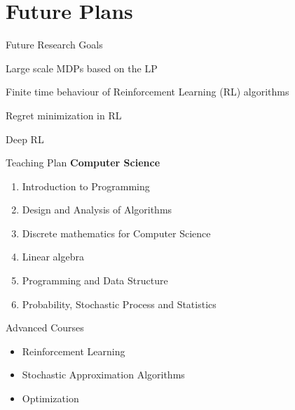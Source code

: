 \documentclass[10pt]{beamer}
\begin{document}
\section{Future Plans}
\begin{frame}[fragile]{Future Research Goals}
\begin{block}{\Large Large scale MDPs based on the LP}
\end{block}
\vspace{10pt}
\begin{block}{\Large Finite time behaviour of Reinforcement Learning (RL) algorithms}
\end{block}
\vspace{10pt}
\begin{block}{\Large Regret minimization in RL}
\end{block}
\vspace{10pt}
\begin{block}{\Large Deep RL}
\end{block}

\end{frame}
\begin{frame}[fragile]{Teaching Plan}
\textbf{Computer Science}
\begin{enumerate}
\item Introduction to Programming
\item Design and Analysis of Algorithms
\item Discrete mathematics for Computer Science
\item Linear algebra
\item Programming and Data Structure
\item Probability, Stochastic Process and Statistics
\end{enumerate}

\end{frame}
\begin{frame}[fragile]{Advanced Courses}
\begin{itemize}
\item Reinforcement Learning
\item Stochastic Approximation Algorithms
\item Optimization
\end{itemize}
\end{frame}
\end{document}
